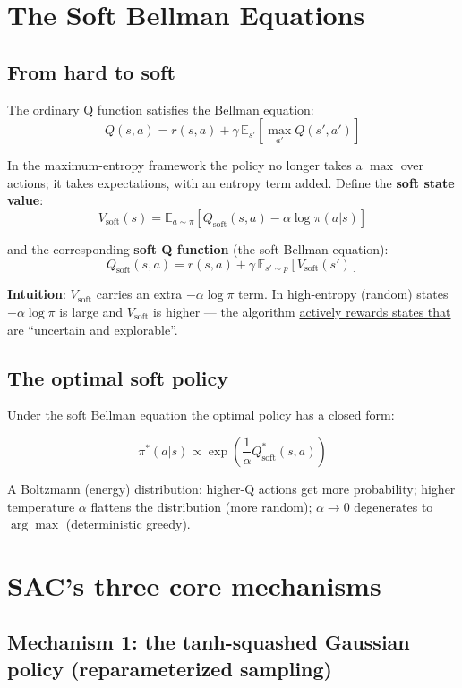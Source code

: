 \documentclass{article}
\begin{document}
\section*{The Soft Bellman Equations}

\subsection*{From hard to soft}

The ordinary Q function satisfies the Bellman equation:
\[
Q(s,a) = r(s,a) + \gamma\,\mathbb{E}_{s'}\!\left[\max_{a'} Q(s',a')\right]
\]

In the maximum-entropy framework the policy no longer takes a $\max$ over actions; it takes expectations, with an entropy term added. Define the \textbf{soft state value}:
\[
\boxed{V_\text{soft}(s) = \mathbb{E}_{a\sim\pi}\!\left[Q_\text{soft}(s,a) - \alpha\log\pi(a|s)\right]}
\]

and the corresponding \textbf{soft Q function} (the soft Bellman equation):
\[
\boxed{Q_\text{soft}(s,a) = r(s,a) + \gamma\,\mathbb{E}_{s'\sim p}\!\left[V_\text{soft}(s')\right]}
\]

\textbf{Intuition}: $V_\text{soft}$ carries an extra $-\alpha\log\pi$ term. In high-entropy (random) states $-\alpha\log\pi$ is large and $V_\text{soft}$ is higher --- the algorithm \underline{actively rewards states that are ``uncertain and explorable''}.

\subsection*{The optimal soft policy}

Under the soft Bellman equation the optimal policy has a closed form:

\[
\pi^*(a|s) \propto \exp\!\left(\frac{1}{\alpha} Q_\text{soft}^*(s,a)\right)
\]

A Boltzmann (energy) distribution: higher-Q actions get more probability; higher temperature $\alpha$ flattens the distribution (more random); $\alpha\to 0$ degenerates to $\arg\max$ (deterministic greedy).

\section*{SAC's three core mechanisms}

\subsection*{Mechanism 1: the tanh-squashed Gaussian policy (reparameterized sampling)}
\end{document}
